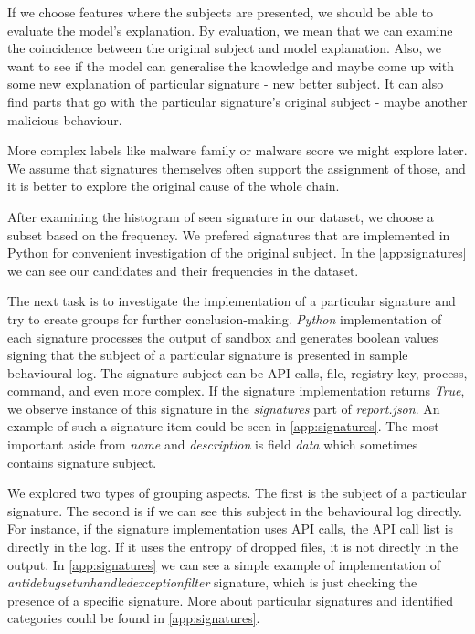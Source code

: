 If we choose features where the subjects are presented, we should be able to evaluate the model's explanation. By evaluation, we mean that we can examine the coincidence between the original subject and model explanation. Also, we want to see if the model can generalise the knowledge and maybe come up with some new explanation of particular signature - new better subject. It can also find parts that go with the particular signature's original subject - maybe another malicious behaviour.

More complex labels like malware family or malware score we might explore later. We assume that signatures themselves often support the assignment of those, and it is better to explore the original cause of the whole chain.

After examining the histogram of seen signature in our dataset, we choose a subset based on the frequency. We prefered signatures that are implemented in Python for convenient investigation of the original subject. In the \ref{app:signatures} we can see our candidates and their frequencies in the dataset.

The next task is to investigate the implementation of a particular signature and try to create groups for further conclusion-making. \emph{Python} implementation of each signature processes the output of sandbox and generates boolean values signing that the subject of a particular signature is presented in sample behavioural log. The signature subject can be API calls, file, registry key, process, command, and even more complex. If the signature implementation returns \emph{True}, we observe instance of this signature in the \emph{signatures} part of \emph{report.json}. An example of such a signature item could be seen in \ref{app:signatures}. The most important aside from \emph{name} and \emph{description} is field \emph{data} which sometimes contains signature subject.

We explored two types of grouping aspects. The first is the subject of a particular signature. The second is if we can see this subject in the behavioural log directly. For instance, if the signature implementation uses API calls, the API call list is directly in the log. If it uses the entropy of dropped files, it is not directly in the output. In \ref{app:signatures} we can see a simple example of implementation of \emph{antidebugsetunhandledexceptionfilter} signature, which is just checking the presence of a specific signature.
More about particular signatures and identified categories could be found in \ref{app:signatures}. 

